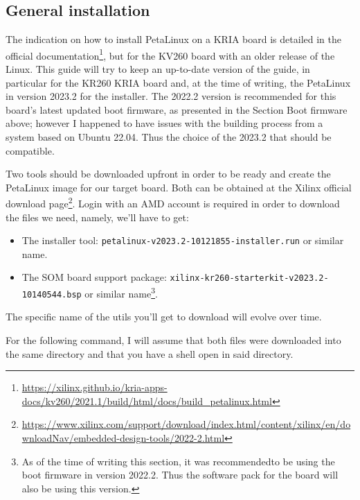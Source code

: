 \documentclass[10pt]{article}
\begin{document}
\subsection{General installation}
\label{sec:orgcc547ed}
The indication on how to install PetaLinux on a KRIA board is detailed in the
official documentation\footnote{\url{https://xilinx.github.io/kria-apps-docs/kv260/2021.1/build/html/docs/build\_petalinux.html}}, but for the KV260 board with an older release of
the Linux. This guide will try to keep an up-to-date version of the guide, in
particular for the KR260 KRIA board and, at the time of writing, the PetaLinux
in version 2023.2 for the installer.  The 2022.2 version is recommended for this
board's latest updated boot firmware, as presented in the Section Boot firmware
above; however I happened to have issues with the building process from a system
based on Ubuntu 22.04. Thus the choice of the 2023.2 that should be compatible.

Two tools should be downloaded upfront in order to be ready and create the
PetaLinux image for our target board. Both can be obtained at the Xilinx
official download page\footnote{\url{https://www.xilinx.com/support/download/index.html/content/xilinx/en/downloadNav/embedded-design-tools/2022-2.html}}. Login with an AMD account is required in order to
download the files we need, namely, we'll have to get:
\begin{itemize}
\item The installer tool: \texttt{petalinux-v2023.2-10121855-installer.run} or similar name.
\item The SOM board support package: \texttt{xilinx-kr260-starterkit-v2023.2-10140544.bsp} or similar name\footnote{As of the time of writing this section, it was recommended\footnotemark to be
using the boot firmware in version 2022.2. Thus the software pack for the board
will also be using this version.}.
\end{itemize}
The specific name of the utils you'll get to download will evolve over time.

For the following command, I will assume that both files were downloaded into
the same directory and that you have a shell open in said directory.
\end{document}

